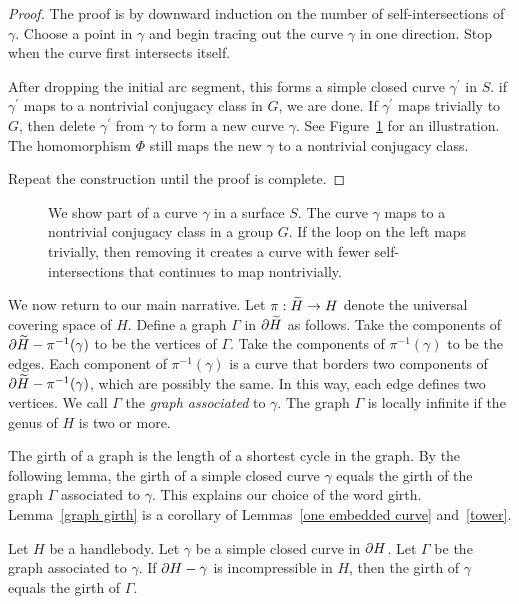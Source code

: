 \begin{proof}
The proof is by downward induction on the number of self-intersections of $\gamma$.  Choose a point in $\gamma$ and begin tracing out the curve $\gamma$ in one direction.  Stop when the curve first intersects itself.

After dropping the initial arc segment, this forms a simple closed curve $\gamma^{\prime}$ in $S$.  if $\gamma^{\prime}$ maps to a nontrivial conjugacy class in $G$, we are done.  If $\gamma^{\prime}$ maps trivially to $G$, then delete $\gamma^{\prime}$ from $\gamma$ to form a new curve $\gamma$.  See Figure~\ref{selfintersection} for an illustration.  The homomorphism $\Phi$ still maps the new $\gamma$ to a nontrivial conjugacy class.

Repeat the construction until the proof is complete.
\end{proof}

\begin{figure}
\caption{
We show part of a curve $\gamma$ in a surface $S$.  The curve $\gamma$ maps to a nontrivial conjugacy class in a group $G$.  If the loop on the left maps trivially, then removing it creates a curve with fewer self-intersections that continues to map nontrivially.
}
\label{selfintersection}
\end{figure}

We now return to our main narrative.  Let $\pi:\widetilde{H}\rightarrow H$ denote the universal covering space of $H$.  Define a graph $\Gamma$ in $\partial \widetilde{H}$ as follows.  Take the components of $\partial\widetilde{H}-\pi^{-1}(\gamma)$ to be the vertices of $\Gamma$.  Take the components of $\pi^{-1}(\gamma)$ to be the edges.  Each component of $\pi^{-1}(\gamma)$ is a curve that borders two components of $\partial\widetilde{H}-\pi^{-1}(\gamma)$, which are possibly the same.  In this way, each edge defines two vertices.  We call $\Gamma$ the \emph{graph associated} to $\gamma$.  The graph $\Gamma$ is locally infinite if the genus of $H$ is two or more.

The girth of a graph is the length of a shortest cycle in the graph.  By the following lemma, the girth of a simple closed curve $\gamma$ equals the girth of the graph $\Gamma$ associated to $\gamma$.  This explains our choice of the word girth.  Lemma~\ref{graph girth} is a corollary of Lemmas~\ref{one embedded curve} and~\ref{tower}.

\begin{lemma}
\label{graph girth}
Let $H$ be a handlebody.  Let $\gamma$ be a simple closed curve in $\partial H$.  Let $\Gamma$ be the graph associated to $\gamma$.  If $\partial H-\gamma$ is incompressible in $H$, then the girth of $\gamma$ equals the girth of $\Gamma$.
\end{lemma}

